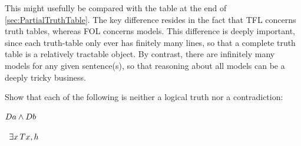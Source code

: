 This might usefully be compared with the table at the end of \cref{sec:PartialTruthTable}. The key difference resides in the fact that TFL concerns truth tables, whereas FOL concerns models. This difference is deeply important, since each truth-table only ever has finitely many lines, so that a complete truth table is a relatively tractable object. By contrast, there are infinitely many models for any given sentence(s), so that reasoning about all models can be a deeply tricky business.



\begin{practiceproblems}
	\problempart
	\label{pr:Contingent}
	Show that each of the following is neither a logical truth nor a contradiction:
	\begin{problemslist}
		\item $\mathord{D}a \mathbin{\wedge} \mathord{D}b$
		
		\item \leftsolutions\ $\exists x\,\mathord{T}x,h$
		
		

\end{problemslist}
\end{practiceproblems}
